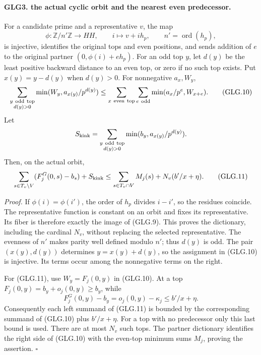 \documentclass[11pt,a4paper]{article}
\numberwithin{equation}{section}
\theoremstyle{remark}\newtheorem{remark}[theorem]{Remark}
\begin{document}
\paragraph{GLG3. the actual cyclic orbit and the nearest even predecessor.}
\label{claim:GLG3}
For a candidate prime and a representative \(v\), the map
\[
 \phi:\mathbb Z/n'\mathbb Z\longrightarrow HH,\qquad
       i\longmapsto v+i h_p,\qquad n'=\operatorname{ord}(h_p),
                                                                    \tag{GLG.9}
\]
is injective, identifies the original tops and even positions,
and sends addition of \(e\) to the original partner
\((0,\phi(i)+e h_p)\). For an odd top \(y\), let \(d(y)\) be
the least positive backward distance to an even top, or zero
if no such top exists. Put \(x(y)=y-d(y)\) when \(d(y)>0\).
For nonnegative \(a_x,W_y\),
\[
 \sum_{\substack{y\ {\rm odd\ top}\\d(y)>0}}
          \min(W_y,a_{x(y)}/p^{d(y)})
 \le\sum_{x\ {\rm even\ top}}\sum_{e\ {\rm odd}}
          \min(a_x/p^e,W_{x+e}).                                  \tag{GLG.10}
\]
Let
\[
 S_{\rm kink}=\sum_{\substack{y\ {\rm odd\ top}\\d(y)>0}}
                      \min(b_y,a_{x(y)}/p^{d(y)}).
 \]
Then, on the actual orbit,
\[
 \sum_{s\in T_v\setminus V}(F_j^G(0,s)-b_s)+S_{\rm kink}
       \le\sum_{s\in T_v\cap V}M_j(s)+N_v(b'/x+\eta).              \tag{GLG.11}
\]

\emph{Proof.}
If \(\phi(i)=\phi(i')\), the order of \(h_p\) divides \(i-i'\),
so the residues coincide. The representative function is constant
on an orbit and fixes its representative. Its fiber is therefore
exactly the image of (GLG.9). This proves the dictionary, including
the cardinal \(N_v\), without replacing the selected representative.
The evenness of \(n'\) makes parity well defined modulo \(n'\);
thus \(d(y)\) is odd. The pair \((x(y),d(y))\) determines
\(y=x(y)+d(y)\), so the assignment in (GLG.10) is injective.
Its terms occur among the nonnegative terms on the right.

For (GLG.11), use \(W_y=F_j(0,y)\) in (GLG.10).
At a top \(F_j(0,y)=b_y+o_j(0,y)\ge b_y\), while
\[
 F_j^G(0,y)-b_y=o_j(0,y)-\kappa_j\le b'/x+\eta.
 \]
Consequently each left summand of (GLG.11) is bounded by
the corresponding summand of (GLG.10) plus \(b'/x+\eta\).
For a top with no predecessor only this last bound is used.
There are at most \(N_v\) such tops. The partner dictionary
identifies the right side of (GLG.10) with the even-top
minimum sums \(M_j\), proving the assertion.
\hfill\(\square\)
\end{document}
